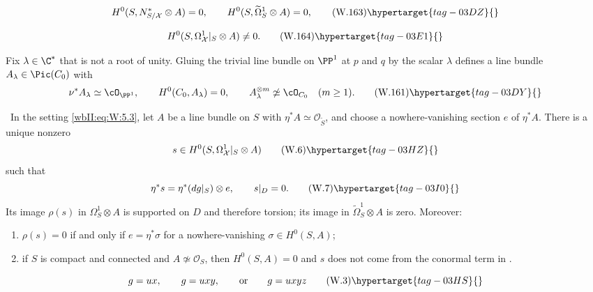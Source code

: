 \[
 H^0(S,N^*_{S/\mathcal X}\otimes A)=0,
 \qquad
 H^0(S,\widetilde\Omega^1_S\otimes A)=0,
 \tag{W.163}\hypertarget{tag-03DZ}{}\label{wbII:eq:CN:4.5}
\]

\[
 H^0(S,\Omega^1_{\mathcal X}|_S\otimes A)\ne0.
 \tag{W.164}\hypertarget{tag-03E1}{}\label{wbII:eq:CN:4.6}
\]

\begin{lemma}
\hypertarget{tag-03IB}{}\label{wbII:lem:gluing-bundle}


Fix $\lambda\in\C^*$ that is not a root of unity.  Gluing the trivial line
bundle on $\PP^1$ at $p$ and $q$ by the scalar $\lambda$ defines a line bundle
\(A_\lambda\in\Pic(C_0)\) with
\[
 \nu^*A_\lambda\simeq\cO_{\PP^1},\qquad
 H^0(C_0,A_\lambda)=0,\qquad
 A_\lambda^{\otimes m}\not\simeq\cO_{C_0}\quad(m\ge1).
 \tag{W.161}\hypertarget{tag-03DY}{}\label{wbII:eq:CN:4.4}
\]
\end{lemma}

\begin{theorem}
\hypertarget{tag-03IK}{}\label{wbII:prop:conductor}

\label{wbII:prop:conductor-differential}
\ In the setting \eqref{wbII:eq:W:5.3}, let $A$ be a line bundle on $S$ with
$\eta^*A\simeq\mathcal O_{\widetilde S}$, and choose a nowhere-vanishing
section $e$ of $\eta^*A$.  There is a unique nonzero
\[
s\in H^0(S,\Omega^1_{\mathcal X}|_S\otimes A)
\tag{W.6}\hypertarget{tag-03HZ}{}\label{wbII:eq:W:5.6}
\]
such that
\[
\eta^*s=\eta^*(dg|_S)\otimes e,\qquad s|_D=0.
\tag{W.7}\hypertarget{tag-03I0}{}\label{wbII:eq:W:5.7}
\]
Its image $\rho(s)$ in $\Omega^1_S\otimes A$ is supported on $D$ and
therefore torsion; its image in
$\widetilde\Omega^1_S\otimes A$ is zero.  Moreover:
\begin{enumerate}[label=(\alph*)]
\item $\rho(s)=0$ if and only if $e=\eta^*\sigma$ for a nowhere-vanishing
$\sigma\in H^0(S,A)$;
\item if $S$ is compact and connected and $A\not\simeq\mathcal O_S$, then
$H^0(S,A)=0$ and $s$ does not come from the conormal term in .
\end{enumerate}
\end{theorem}

\[
g=ux,\qquad g=uxy,\qquad\text{or}\qquad g=uxyz
\tag{W.3}\hypertarget{tag-03HS}{}\label{wbII:eq:W:5.3}
\]


